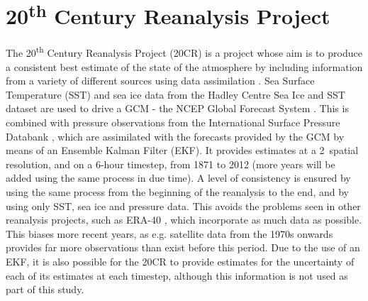 \documentclass[pdftex,12pt,a4paper]{report}
\newcommand{\ts}{\textsuperscript}
\begin{document}
\section{20\ts{th} Century Reanalysis Project}
\label{sec:20crp}
The 20\ts{th} Century Reanalysis Project (20CR) is a project whose aim is to produce a consistent
best estimate of the state of the atmosphere by including information from a variety of different
sources using data assimilation \parencite{compoTwentieth2011}. Sea Surface Temperature (SST) and
sea ice data from the Hadley Centre Sea Ice and SST dataset \parencite{rayner2003global} are used to drive
a GCM - the NCEP Global Forecast System \parencite{kanamitsu1989description, kanamitsu1991recent}.
This is combined with pressure observations from the International Surface Pressure Databank
\parencite{yin2008international}, which are assimilated with the forecasts provided by the GCM by
means of an Ensemble Kalman Filter (EKF). It provides estimates at a 2\textdegree\ spatial
resolution, and on a 6-hour timestep, from 1871 to 2012 (more years will be added using the same
process in due time). A level of consistency is ensured by using the same process from the beginning
of the reanalysis to the end, and by using only SST, sea ice and pressure data. This avoids the
problems seen in other reanalysis projects, such as ERA-40 \parencite{uppala2005era}, which
incorporate as much data as possible. This biases more recent years, as e.g. satellite data from the
1970s onwards provides far more observations than exist before this period. Due to the use of an
EKF, it is also possible for the 20CR to provide estimates for the uncertainty of each of its
estimates at each timestep, although this information is not used as part of this study.
\end{document}
